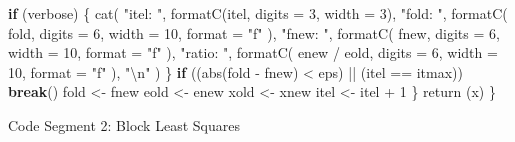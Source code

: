 \documentclass[
  12pt,
]{book}
\newenvironment{Shaded}{\begin{snugshade}}{\end{snugshade}}
\newcommand{\AttributeTok}[1]{\textcolor[rgb]{0.77,0.63,0.00}{#1}}
\newcommand{\ControlFlowTok}[1]{\textcolor[rgb]{0.13,0.29,0.53}{\textbf{#1}}}
\newcommand{\DecValTok}[1]{\textcolor[rgb]{0.00,0.00,0.81}{#1}}
\newcommand{\FunctionTok}[1]{\textcolor[rgb]{0.00,0.00,0.00}{#1}}
\newcommand{\NormalTok}[1]{#1}
\newcommand{\OtherTok}[1]{\textcolor[rgb]{0.56,0.35,0.01}{#1}}
\newcommand{\SpecialCharTok}[1]{\textcolor[rgb]{0.00,0.00,0.00}{#1}}
\newcommand{\StringTok}[1]{\textcolor[rgb]{0.31,0.60,0.02}{#1}}
\begin{document}
\begin{Shaded}
\begin{Highlighting}[]
      \ControlFlowTok{if}\NormalTok{ (verbose) \{}
        \FunctionTok{cat}\NormalTok{(}
          \StringTok{"itel: "}\NormalTok{,}
          \FunctionTok{formatC}\NormalTok{(itel, }\AttributeTok{digits =} \DecValTok{3}\NormalTok{, }\AttributeTok{width =} \DecValTok{3}\NormalTok{),}
          \StringTok{"fold: "}\NormalTok{,}
          \FunctionTok{formatC}\NormalTok{(}
\NormalTok{            fold,}
            \AttributeTok{digits =} \DecValTok{6}\NormalTok{,}
            \AttributeTok{width =} \DecValTok{10}\NormalTok{,}
            \AttributeTok{format =} \StringTok{"f"}
\NormalTok{          ),}
          \StringTok{"fnew: "}\NormalTok{,}
          \FunctionTok{formatC}\NormalTok{(}
\NormalTok{            fnew,}
            \AttributeTok{digits =} \DecValTok{6}\NormalTok{,}
            \AttributeTok{width =} \DecValTok{10}\NormalTok{,}
            \AttributeTok{format =} \StringTok{"f"}
\NormalTok{          ),}
          \StringTok{"ratio: "}\NormalTok{,}
          \FunctionTok{formatC}\NormalTok{(}
\NormalTok{            enew }\SpecialCharTok{/}\NormalTok{ eold,}
            \AttributeTok{digits =} \DecValTok{6}\NormalTok{,}
            \AttributeTok{width =} \DecValTok{10}\NormalTok{,}
            \AttributeTok{format =} \StringTok{"f"}
\NormalTok{          ),}
          \StringTok{"}\SpecialCharTok{\textbackslash{}n}\StringTok{"}
\NormalTok{        )}
\NormalTok{      \}}
      \ControlFlowTok{if}\NormalTok{ ((}\FunctionTok{abs}\NormalTok{(fold }\SpecialCharTok{{-}}\NormalTok{ fnew) }\SpecialCharTok{\textless{}}\NormalTok{ eps) }\SpecialCharTok{||}\NormalTok{ (itel }\SpecialCharTok{==}\NormalTok{ itmax))}
        \ControlFlowTok{break}\NormalTok{()}
\NormalTok{      fold }\OtherTok{\textless{}{-}}\NormalTok{ fnew}
\NormalTok{      eold }\OtherTok{\textless{}{-}}\NormalTok{ enew}
\NormalTok{      xold }\OtherTok{\textless{}{-}}\NormalTok{ xnew}
\NormalTok{      itel }\OtherTok{\textless{}{-}}\NormalTok{ itel }\SpecialCharTok{+} \DecValTok{1}
\NormalTok{    \}}
    \FunctionTok{return}\NormalTok{ (x)}
\NormalTok{  \}}
\end{Highlighting}
\end{Shaded}

Code Segment 2: Block Least Squares
\end{document}
